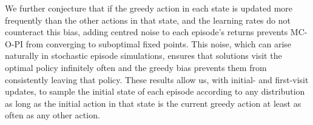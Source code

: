 We further conjecture that if the greedy action in each state is updated more frequently than the other actions in that state, and the learning rates do not counteract this bias, adding centred noise to each episode's returns prevents MC-O-PI from converging to suboptimal fixed points. 
This noise, which can arise naturally in stochastic episode simulations, ensures that solutions visit the optimal policy infinitely often and the greedy bias prevents them from consistently leaving that policy.
% 
These results allow us, with initial- and first-visit updates, to sample the initial state of each episode according to any distribution as long as the initial action in that state is the current greedy action at least as often as any other action. 









